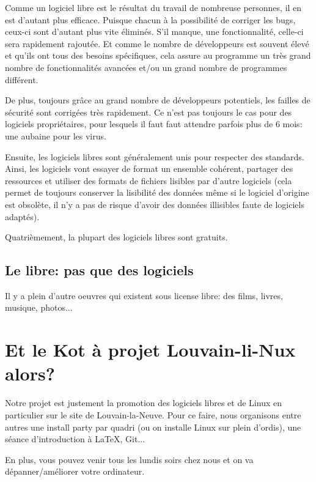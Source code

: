 \documentclass[11pt]{../fiche}
\begin{document}
Comme un logiciel libre est le résultat du travail de nombreuse personnes, il
en est d'autant plus efficace. Puisque chacun à la possibilité de corriger les
bugs, ceux-ci sont d'autant plus vite éliminés. S'il manque, une
fonctionnalité, celle-ci sera rapidement rajoutée. Et comme le nombre de
développeurs est souvent élevé et qu'ils ont tous des besoins spécifiques, cela
assure au programme un très grand nombre de fonctionnalités avancées et/ou un
grand nombre de programmes différent.

De plus, toujours grâce au grand nombre de développeurs potentiels,
les failles de sécurité sont corrigées très rapidement. Ce n'est pas
toujours le cas pour des logiciels propriétaires, pour lesquels il faut
faut attendre parfois plus de 6 mois: une aubaine pour les virus.

Ensuite, les logiciels libres sont généralement unis pour respecter des
standards. Ainsi, les logiciels vont essayer de format un ensemble cohérent,
partager des ressources et utiliser des formats de fichiers lisibles par
d'autre logiciels (cela permet de toujours conserver la lisibilité des données
même si le logiciel d'origine est obsolète, il n'y a pas de risque d'avoir des
données illisibles faute de logiciels adaptés).

Quatrièmement, la plupart des logiciels libres sont gratuits.

\subsection*{Le libre: pas que des logiciels}

Il y a plein d'autre oeuvres qui existent sous license libre: des films,
livres, musique, photos...

\section*{Et le Kot à projet Louvain-li-Nux alors?}
Notre projet est justement la promotion des logiciels libres et de Linux en particulier sur le site de Louvain-la-Neuve.
Pour ce faire, nous organisons entre autres une install party par quadri (ou on installe Linux sur plein d'ordis),
une séance d'introduction à \LaTeX{}, Git...

En plus, vous pouvez venir tous les lundis soirs chez nous et on va dépanner/améliorer votre ordinateur.
\end{document}
